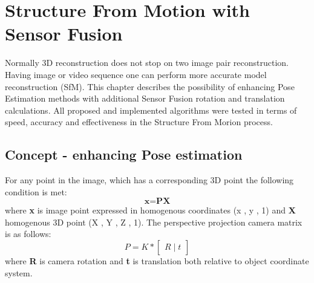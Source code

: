 \ifpdf
    \graphicspath{{figures/}{figures/comparisons}}
\else
    \graphicspath{{figures/}{figures/comparisons}}
\fi

\chapter{Structure From Motion with Sensor Fusion} \label{chap:structure_from_motion}
Normally 3D reconstruction does not stop on two image pair reconstruction. Having image or video sequence one can perform more accurate model reconstruction (SfM).
This chapter describes the possibility of enhancing Pose Estimation methods with additional Sensor Fusion rotation and translation calculations. All proposed and implemented algorithms were tested in terms of speed, accuracy and effectiveness in the Structure From Morion process.
\section{Concept - enhancing Pose estimation}
For any point in the image, which has a corresponding 3D point the following condition is met:
\begin{equation} \label{eq:projectionEquation}
 \textbf{x} = \textbf{P}\textbf{X}
\end{equation}
where \textbf{x} is image point expressed in homogenous coordinates (x , y , 1) and \textbf{X} homogenous 3D point (X , Y , Z , 1). The perspective projection camera matrix is as follows: 
\begin{equation} \label{eq:projectionEquation}
 P = K * \begin{bmatrix}R\mid t\end{bmatrix}
\end{equation}
where \textbf{R} is camera rotation and \textbf{t} is translation both relative to object coordinate system.
